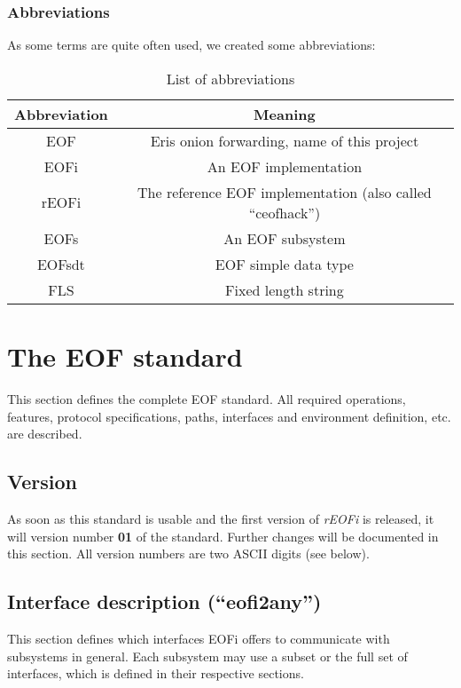 \documentclass[12pt,a4paper]{book}
\begin{document}
\subsection{Abbreviations}
As some terms are quite often used, we created some abbreviations:
%
%
%
%
%
%
\begin{longtable}{|c|c|}
\caption{List of abbreviations}\\
\hline
\textbf{Abbreviation} & \textbf{Meaning}\\
\hline
EOF & Eris onion forwarding, name of this project\\
\hline
EOFi & An EOF implementation\\
\hline
rEOFi & The reference EOF implementation (also called "`ceofhack"')\\
\hline
EOFs & An EOF subsystem\\
\hline
EOFsdt & EOF simple data type\\
\hline
FLS & Fixed length string\\
\hline
\end{longtable}
\chapter{The EOF standard}
This section defines the complete EOF standard. All required operations,
features, protocol specifications, paths, interfaces and environment definition,
etc. are described.
\section{Version}
As soon as this standard is usable and the first version of \emph{rEOFi}
is released, it will version number \textbf{01} of the standard.
Further changes will be documented in this section. All version numbers
are two ASCII digits (see below).
\section{Interface description ("`eofi2any"')}
This section defines which interfaces EOFi offers to communicate with
subsystems in general. Each subsystem may use a subset or the full set
of interfaces, which is defined in their respective sections.
\end{document}

